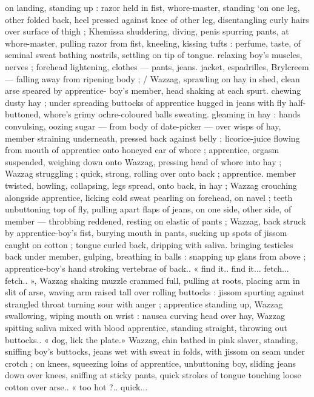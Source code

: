 on landing, standing up : razor held in fist, whore-master, standing
‘on one leg, other folded back, heel pressed against knee of other
leg, disentangling curly hairs over surface of thigh ; Khemissa
shuddering, diving, penis spurring pants, at whore-master, pulling
razor from fist, kneeling, kissing tufts : perfume, taste, of seminal
sweat bathing nostrils, settling on tip of tongue. relaxing boy's
muscles, nerves ; forehead lightening, clothes --- pants, jeans.
jacket, espadrilles, Brylcreem --- falling away from ripening body ; /
Wazzag, sprawling on hay in shed, clean arse speared by apprentice-
boy's member, head shaking at each spurt. chewing dusty hay ;
under spreading buttocks of apprentice hugged in jeans with fly half-
buttoned, whore’s grimy ochre-coloured balls sweating. gleaming in
hay : hands convulsing, oozing sugar --- from body of date-picker ---
over wisps of hay, member straining underneath, pressed back
against belly ; licorice-juice flowing from mouth of apprentice onto
honeyed ear of whore ; apprentice, orgasm suspended, weighing
down onto Wazzag, pressing head of whore into hay ; Wazzag
struggling ; quick, strong, rolling over onto back ; apprentice.
member twisted, howling, collapsing, legs spread, onto back, in hay
; Wazzag crouching alongside apprentice, licking cold sweat pearling
on forehead, on navel ; teeth unbuttoning top of fly, pulling apart
flaps of jeans, on one side, other side, of member --- throbbing
reddened, resting on elastic of pants ; Wazzag, back struck by
apprentice-boy's fist, burying mouth in pants, sucking up spots of
jissom caught on cotton ; tongue curled back, dripping with saliva.
bringing testicles back under member, gulping, breathing in balls :
snapping up glans from above ; apprentice-boy's hand stroking
vertebrae of back.. « find it.. find it... fetch... fetch.. », Wazzag
shaking muzzle crammed full, pulling at roots, placing arm in slit of
arse, waving arm raised tall over rolling buttocks : jissom spurting
against strangled throat turning sour with anger ; apprentice
standing up, Wazzag swallowing, wiping mouth on wrist : nausea
curving head over hay, Wazzag spitting saliva mixed with blood
apprentice, standing straight, throwing out buttocks.. « dog, lick the
plate.» Wazzag, chin bathed in pink slaver, standing, sniffing boy's
buttocks, jeans wet with sweat in folds, with jissom on seam under
crotch ; on knees, squeezing loins of apprentice, unbuttoning boy,
sliding jeans down over knees, sniffing at sticky pants, quick strokes
of tongue touching loose cotton over arse.. « too hot ?.. quick...
